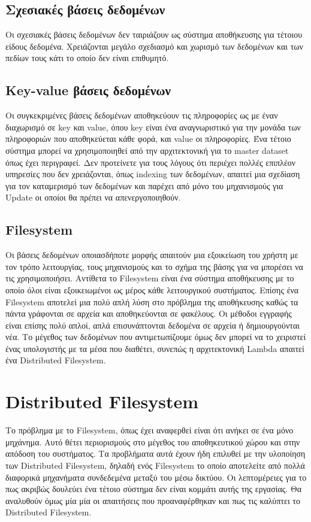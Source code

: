 \subsection{Σχεσιακές βάσεις δεδομένων}
Οι σχεσιακές βάσεις δεδομένων δεν ταιριάζουν ως σύστημα αποθήκευσης για τέτοιου είδους δεδομένα. Χρειάζονται μεγάλο σχεδιασμό και χωρισμό των δεδομένων και των πεδίων τους κάτι το οποίο δεν είναι επιθυμητό.

\subsection{Κey-value βάσεις δεδομένων}
Οι συγκεκριμένες βάσεις δεδομένων αποθηκεύουν τις πληροφορίες ως με έναν διαχωρισμό σε key και value, όπου key είναι ένα αναγνωριστικό για την μονάδα των πληροφοριών που αποθηκεύεται κάθε φορά, και value οι πληροφορίες. Ένα τέτοιο σύστημα μπορεί να χρησιμοποιηθεί από την αρχιτεκτονική για το master dataset όπως έχει περιγραφεί. Δεν προτείνετε για τους λόγους ότι περιέχει πολλές επιπλέον υπηρεσίες που δεν χρειάζονται, όπως indexing των δεδομένων, απαιτεί μια σχεδίαση για τον καταμερισμό των δεδομένων και παρέχει από μόνο του μηχανισμούς για Update οι οποίοι θα πρέπει να απενεργοποιηθούν.

\subsection{Filesystem}
Οι βάσεις δεδομένων οποιασδήποτε μορφής απαιτούν μια εξοικείωση του χρήστη με τον τρόπο λειτουργίας, τους μηχανισμούς και το σχήμα της βάσης για να μπορέσει να τις χρησιμοποιήσει. Αντίθετα το Filesystem είναι ένα σύστημα αποθήκευσης με το οποίο όλοι είναι εξοικειωμένοι ως μέρος κάθε λειτουργικού συστήματος. Επίσης ένα Filesystem αποτελεί μια πολύ απλή λύση στο πρόβλημα της αποθήκευσης καθώς τα πάντα γράφονται σε αρχεία και αποθηκεύονται σε φακέλους. Οι μέθοδοι εγγραφής είναι επίσης πολύ απλοί, απλά επισυνάπτονται δεδομένα σε αρχεία ή δημιουργούνται νέα. Το μέγεθος των δεδομένων που αντιμετωπίζουμε όμως δεν μπορεί να το χειριστεί ένας υπολογιστής με τα μέσα που διαθέτει, συνεπώς η αρχιτεκτονική Lambda απαιτεί ένα Distributed Filesystem.  

\section{Distributed Filesystem}

Το πρόβλημα με το Filesystem, όπως έχει αναφερθεί είναι ότι ανήκει σε ένα μόνο μηχάνημα. Αυτό θέτει περιορισμούς στο μέγεθος του αποθηκευτικού χώρου και στην απόδοση του συστήματος. Τα προβλήματα αυτά έχουν ήδη επιλυθεί με την υλοποίηση των Distributed Filesystem, δηλαδή ενός Filesystem το οποίο αποτελείτε από πολλά διαφορικά μηχανήματα συνδεδεμένα μεταξύ του μέσω δικτύου. Οι λεπτομέρειες για το πως ακριβώς δουλεύει ένα τέτοιο σύστημα δεν είναι κομμάτι αυτής της εργασίας. Θα αναλυθούν όμως μία μία οι απαιτήσεις που προαναφέρθηκαν και πως τις καλύπτει το Distributed Filesystem.
